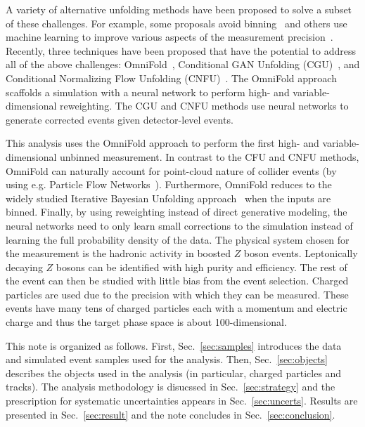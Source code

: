 A variety of alternative unfolding methods have been proposed to solve a subset of these challenges.   For example, some proposals avoid binning~\cite{Glazov:2017vni,Datta:2018mwd,Lindemann:1995ut,Aslan:2003vu} and others use machine learning to improve various aspects of the measurement precision~\cite{Gagunashvili:2010zw,Glazov:2017vni,Datta:2018mwd}.  Recently, three techniques have been proposed that have the potential to address all of the above challenges: OmniFold~\cite{1911.09107}, Conditional GAN Unfolding (CGU)~\cite{Bellagente:2019uyp}, and Conditional Normalizing Flow Unfolding (CNFU)~\cite{Bellagente:2020piv}.   The OmniFold approach scaffolds a simulation with a neural network to perform high- and variable-dimensional reweighting.  The CGU and CNFU methods use neural networks to generate corrected events given detector-level events.

This analysis uses the OmniFold approach to perform the first high- and variable-dimensional unbinned measurement.  In contrast to the CFU and CNFU methods, OmniFold can naturally account for point-cloud nature of collider events (by using e.g. Particle Flow Networks~\cite{Komiske:2018cqr}).  Furthermore, OmniFold reduces to the widely studied Iterative Bayesian Unfolding approach~\cite{DAGOSTINI1995487} when the inputs are binned.  Finally, by using reweighting instead of direct generative modeling, the neural networks need to only learn small corrections to the simulation instead of learning the full probability density of the data.   The physical system chosen for the measurement is the hadronic activity in boosted $Z$ boson events.  Leptonically decaying $Z$ bosons can be identified with high purity and efficiency.  The rest of the event can then be studied with little bias from the event selection.  Charged particles are used due to the precision with which they can be measured.  These events have many tens of charged particles each with a momentum and electric charge and thus the target phase space is about 100-dimensional.

This note is organized as follows.  First, Sec.~\ref{sec:samples} introduces the data and simulated event samples used for the analysis.  Then, Sec.~\ref{sec:objects} describes the objects used in the analysis (in particular, charged particles and tracks).  The analysis methodology is disucssed in Sec.~\ref{sec:strategy} and the prescription for systematic uncertainties appears in Sec.~\ref{sec:uncerts}.  Results are presented in Sec.~\ref{sec:result} and the note concludes in Sec.~\ref{sec:conclusion}.
